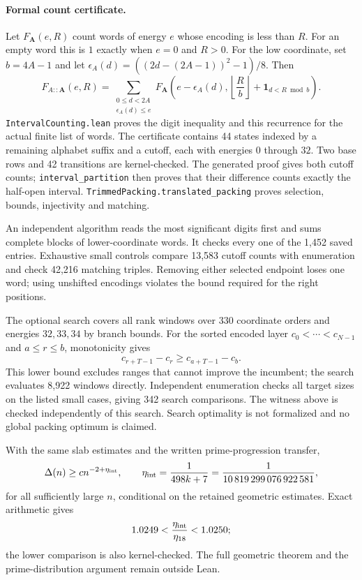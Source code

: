 \documentclass[11pt]{article}
\begin{document}
\paragraph{Formal count certificate.}
Let $F_{\mathbf A}(e,R)$ count words of energy $e$ whose encoding is
less than $R$. For an empty word this is $1$ exactly when $e=0$ and
$R>0$. For the low coordinate, set $b=4A-1$ and let
$\epsilon_A(d)=((2d-(2A-1))^2-1)/8$. Then
\[
 F_{A::\mathbf A}(e,R)=
 \sum_{\substack{0\le d<2A\\\epsilon_A(d)\le e}}
 F_{\mathbf A}\!\left(e-\epsilon_A(d),
   \left\lfloor\frac Rb\right\rfloor+\mathbf1_{d<R\bmod b}\right).
\]
\texttt{IntervalCounting.lean} proves the digit inequality and this
recurrence for the actual finite list of words. The certificate contains
44 states indexed by a remaining alphabet suffix and a cutoff, each
with energies $0$ through $32$. Two base rows and 42 transitions are
kernel-checked. The generated proof gives both cutoff counts;
\texttt{interval\_partition} then proves that their difference counts
exactly the half-open interval. \texttt{TrimmedPacking.translated\_packing}
proves selection, bounds, injectivity and matching.

An independent algorithm reads the most significant digits first and
sums complete blocks of lower-coordinate words. It checks every one of
the 1,452 saved entries. Exhaustive small controls compare 13,583 cutoff
counts with enumeration and check 42,216 matching triples. Removing
either selected endpoint loses one word; using unshifted encodings
violates the bound required for the right positions.

The optional search covers all rank windows over 330 coordinate orders
and energies $32,33,34$ by branch bounds. For the sorted encoded layer
$c_0<\cdots<c_{N-1}$ and $a\le r\le b$, monotonicity gives
\[
 c_{r+T-1}-c_r\ge c_{a+T-1}-c_b.
\]
This lower bound excludes ranges that cannot improve the incumbent;
the search evaluates 8,922 windows directly. Independent enumeration
checks all target sizes on the listed small cases, giving 342 search
comparisons. The witness above is checked independently of this search.
Search optimality is not formalized and no global packing optimum is claimed.

With the same slab estimates and the written prime-progression transfer,
\[
 \Delta(n)\ge c n^{-2+\eta_{\rm int}},\qquad
 \eta_{\rm int}=\frac1{498k+7}
   =\frac1{10\,819\,299\,076\,922\,581},
\]
for all sufficiently large $n$, conditional on the retained geometric estimates.
Exact arithmetic gives
\[
 1.0249<\frac{\eta_{\rm int}}{\eta_{18}}<1.0250;
\]
the lower comparison is also kernel-checked. The full geometric theorem
and the prime-distribution argument remain outside Lean.
\end{document}
